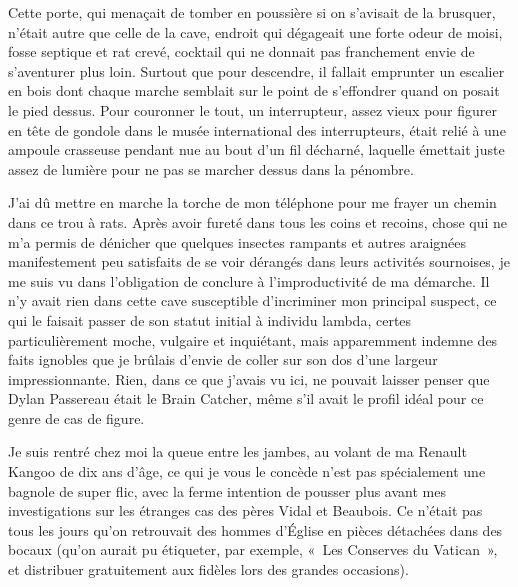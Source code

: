 %
%
Cette porte, qui menaçait de tomber en poussière si on s’avisait de la brusquer, n’était autre que celle de la cave, endroit qui dégageait une forte odeur de moisi, fosse septique et rat crevé, cocktail qui ne donnait pas franchement envie de s’aventurer plus loin. Surtout que pour descendre, il fallait emprunter un escalier en bois dont chaque marche semblait sur le point de s’effondrer quand on posait le pied dessus. Pour couronner le tout, un interrupteur, assez vieux pour figurer en tête de gondole dans le musée international des interrupteurs, était relié à une ampoule crasseuse pendant nue au bout d’un fil décharné, laquelle émettait juste assez de lumière pour ne pas se marcher dessus dans la pénombre.

J’ai dû mettre en marche la torche de mon téléphone pour me frayer un chemin dans ce trou à rats. Après avoir fureté dans tous les coins et recoins, chose qui ne m’a permis de dénicher que quelques insectes rampants et autres araignées manifestement peu satisfaits de se voir dérangés dans leurs activités sournoises, je me suis vu dans l’obligation de conclure à l’improductivité de ma démarche. Il n’y avait rien dans cette cave susceptible d’incriminer mon principal suspect, ce qui le faisait passer de son statut initial à individu lambda, certes particulièrement moche, vulgaire et inquiétant, mais apparemment indemne des faits ignobles que je brûlais d’envie de coller sur son dos d’une largeur impressionnante. Rien, dans ce que j’avais vu ici, ne pouvait laisser penser que Dylan Passereau était le Brain Catcher, même s’il avait le profil idéal pour ce genre de cas de figure.

\illusloflabel{}%
%
Je suis rentré chez moi la queue entre les jambes, au volant de ma Renault Kangoo de dix ans d’âge, ce qui je vous le concède n’est pas spécialement une bagnole de super flic, avec la ferme intention de pousser plus avant mes investigations sur les étranges cas des pères Vidal et Beaubois. Ce n’était pas tous les jours qu’on retrouvait des hommes d’Église en pièces détachées dans des bocaux (qu’on aurait pu étiqueter, par exemple, «~Les Conserves du Vatican~», et distribuer gratuitement aux fidèles lors des grandes occasions).

